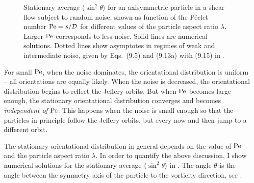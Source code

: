 \documentclass[thesis.tex]{subfiles}
\begin{document}
\begin{figure}
\centering
\caption{ Stationary average $\langle \sin ^2\theta \rangle$ for an axisymmetric particle in a shear flow subject to random noise, shown as function of the P\'eclet number $\mbox{Pe} = s/\mathcal D$ for different values of the particle aspect ratio $\lambda$. Larger $\mbox{Pe}$ corresponds to less noise. Solid lines are numerical solutions. Dotted lines show asymptotes in regimes of weak and intermediate noise, given by Eqs.~(9.5) and (9.13a) with (9.15) in \cite{brenner1974}.}%
\end{figure}

For small $\mbox{Pe}$, when the noise dominates, the orientational distribution is uniform -- all orientations are equally likely. When the noise is decreased, the orientational distribution begins to reflect the Jeffery orbits. 
But when $\mbox{Pe}$ becomes large enough, the stationary orientational distribution converges and becomes \emph{independent of} $\mbox{Pe}$. This happens when the noise is small enough so that the particles in principle follow the Jeffery orbits, but every now and then jump to a different orbit.

The stationary orientational distribution in general depends on the value of $\mbox{Pe}$ and the particle aspect ratio $\lambda$. In order to quantify the above discussion, I show numerical solutions for the stationary average $\langle \sin^2\theta \rangle$ in . The angle $\theta$ is the angle between the symmetry axis of the particle to the vorticity direction, see .
\end{document}
